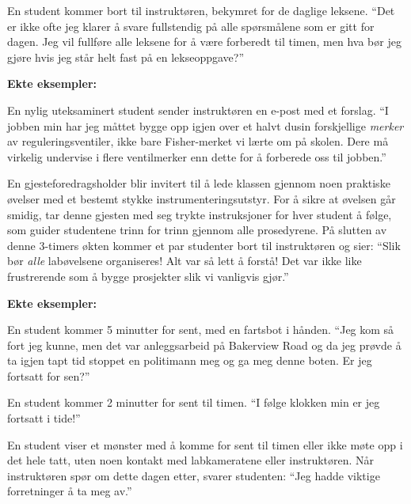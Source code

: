 En student kommer bort til instruktøren, bekymret for de daglige leksene.  ``Det er ikke ofte jeg klarer å svare fullstendig på alle spørsmålene som er gitt for dagen.  Jeg vil fullføre alle leksene for å være forberedt til timen, men hva bør jeg gjøre hvis jeg står helt fast på en lekseoppgave?''






\vfil \eject
\noindent
{\bf Ekte eksempler:} 

En nylig uteksaminert student sender instruktøren en e-post med et forslag.  ``I jobben min har jeg måttet bygge opp igjen over et halvt dusin forskjellige {\it merker} av reguleringsventiler, ikke bare Fisher-merket vi lærte om på skolen.  Dere må virkelig undervise i flere ventilmerker enn dette for å forberede oss til jobben.''

\vskip 20pt

En gjesteforedragsholder blir invitert til å lede klassen gjennom noen praktiske øvelser med et bestemt stykke instrumenteringsutstyr.  For å sikre at øvelsen går smidig, tar denne gjesten med seg trykte instruksjoner for hver student å følge, som guider studentene trinn for trinn gjennom alle prosedyrene.  På slutten av denne 3-timers økten kommer et par studenter bort til instruktøren og sier: ``Slik bør {\it alle} labøvelsene organiseres!  Alt var så lett å forstå!  Det var ikke like frustrerende som å bygge prosjekter slik vi vanligvis gjør.''






\vfil \eject
\noindent
{\bf Ekte eksempler:} 

En student kommer 5 minutter for sent, med en fartsbot i hånden.  ``Jeg kom så fort jeg kunne, men det var anleggsarbeid på Bakerview Road og da jeg prøvde å ta igjen tapt tid stoppet en politimann meg og ga meg denne boten.  Er jeg fortsatt for sen?''

\vskip 20pt

En student kommer 2 minutter for sent til timen.  ``I følge klokken min er jeg fortsatt i tide!''

\vskip 20pt

En student viser et mønster med å komme for sent til timen eller ikke møte opp i det hele tatt, uten noen kontakt med labkameratene eller instruktøren.  Når instruktøren spør om dette dagen etter, svarer studenten: ``Jeg hadde viktige forretninger å ta meg av.''

\vskip 20pt

